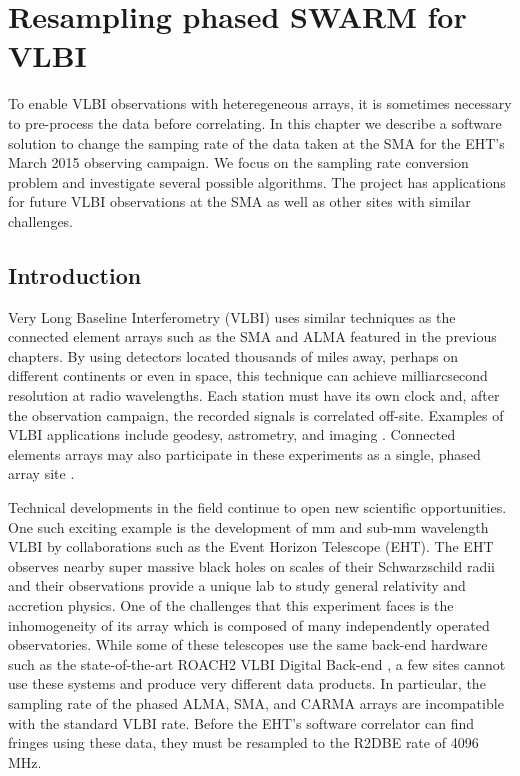 \newcommand{\z}{\mathpzc{z}}
\newcommand{\falign}{0}
\newcommand{\talign}{7.5}

\chapter{Resampling phased SWARM for VLBI}
\label{chap:aphids}


To enable VLBI observations with heteregeneous arrays, it is sometimes necessary to pre-process
the data before correlating.  In this chapter we describe a software solution to change the 
samping rate of the data taken at the SMA for the EHT's March 2015 observing campaign.  We 
focus on the sampling rate conversion problem and investigate several possible algorithms.  The project
has applications for future VLBI observations at the SMA as well as other sites with similar 
challenges.

\section{Introduction}

Very Long Baseline Interferometry (VLBI) uses similar techniques as the connected element arrays such as the 
SMA and ALMA
featured in the previous chapters.  By using detectors located thousands of miles away, perhaps on different 
continents or even in space, this technique can achieve milliarcsecond resolution at radio wavelengths.  Each 
station must have its own clock and, after the observation campaign, the recorded signals is correlated off-site. 
Examples of VLBI applications include geodesy, astrometry, and imaging \citep{felli89,sovers98}.  Connected
elements arrays may also participate in these experiments as a single, phased array site \citep{thompson01}.

Technical developments in the field continue to open new scientific opportunities.  One such exciting example 
is the development of mm and sub-mm wavelength VLBI by collaborations such as the Event Horizon
Telescope (EHT).  The EHT observes nearby super massive black holes on scales of their Schwarzschild radii and
their observations provide a unique lab to study general relativity and accretion physics.  One of the 
challenges that this experiment faces is the inhomogeneity of its array which is composed of many independently 
operated observatories.  While some of these telescopes use the same back-end hardware such as the 
state-of-the-art ROACH2 VLBI Digital Back-end \citep[R2DBE;][]{vertatschitsch16}, a few sites 
cannot use these systems and produce very 
different data products. In particular, the sampling rate of the phased ALMA, SMA, and CARMA arrays are 
incompatible with the standard VLBI rate.  Before the EHT's software correlator
\citep[DIFX;][]{deller07} can find fringes using these data, they must be resampled to the R2DBE rate of 
4096\,MHz.  

